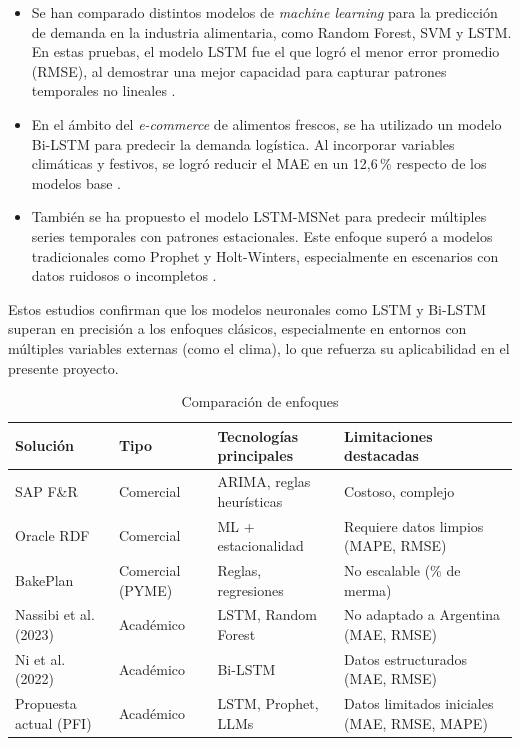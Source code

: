 \begin{itemize}
    \item Se han comparado distintos modelos de \textit{machine learning} para la predicción de demanda en la industria alimentaria, como Random Forest, SVM y LSTM. En estas pruebas, el modelo LSTM fue el que logró el menor error promedio (RMSE), al demostrar una mejor capacidad para capturar patrones temporales no lineales \parencite{nassibi2023}.

    \item En el ámbito del \textit{e-commerce} de alimentos frescos, se ha utilizado un modelo Bi-LSTM para predecir la demanda logística. Al incorporar variables climáticas y festivos, se logró reducir el MAE en un 12{,}6\,\% respecto de los modelos base \parencite{ni2022}.

    \item También se ha propuesto el modelo LSTM-MSNet para predecir múltiples series temporales con patrones estacionales. Este enfoque superó a modelos tradicionales como Prophet y Holt-Winters, especialmente en escenarios con datos ruidosos o incompletos \parencite{bandara2020}.
\end{itemize}

Estos estudios confirman que los modelos neuronales como LSTM y Bi-LSTM superan en precisión a los enfoques clásicos, especialmente en entornos con múltiples variables externas (como el clima), lo que refuerza su aplicabilidad en el presente proyecto.



\begin{table}[t]
    \centering
    \renewcommand{\arraystretch}{1.3}
    \caption{Comparación de enfoques}
    \label{tab:comparacion}
    \begin{tabular}{|p{2.9cm}|p{2cm}|p{3cm}|p{5cm}|}
        \hline
        \textbf{Solución} & \textbf{Tipo} & \textbf{Tecnologías principales} & \textbf{Limitaciones destacadas} \\
        \hline
        SAP F\&R & Comercial & ARIMA, reglas heurísticas & Costoso, complejo \\
        \hline
        Oracle RDF & Comercial & ML + estacionalidad & Requiere datos limpios (MAPE, RMSE) \\
        \hline
        BakePlan & Comercial (PYME) & Reglas, regresiones & No escalable (\% de merma) \\
        \hline
        Nassibi et al. (2023) & Académico & LSTM, Random Forest & No adaptado a Argentina (MAE, RMSE) \\
        \hline
        Ni et al. (2022) & Académico & Bi-LSTM & Datos estructurados (MAE, RMSE) \\
        \hline
        Propuesta actual (PFI) & Académico & LSTM, Prophet, LLMs & Datos limitados iniciales (MAE, RMSE, MAPE) \\
        \hline
    \end{tabular}
\end{table}


